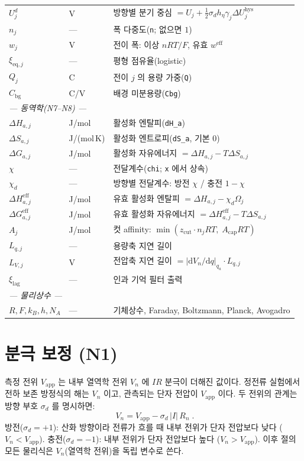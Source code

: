 \documentclass[11pt,a4paper]{article}
\newcommand{\dd}{\mathrm{d}}
\newcommand{\app}{\mathrm{app}}
\newcommand{\eq}{\mathrm{eq}}
\newcommand{\eff}{\mathrm{eff}}
\newcommand{\bg}{\mathrm{bg}}
\newcommand{\hys}{\mathrm{hys}}
\begin{document}
\begin{longtable}{p{} p{} p{}}
$U_j^d$ & V & 방향별 분기 중심 $=U_j+\tfrac12\sigma_d h_\eta\gamma_j\Delta U_j^\hys$\\
$n_j$ & --- & 폭 다중도(\texttt{n}; 없으면 $1$)\\
$w_j$ & V & 전이 폭: 이상 $nRT/F$, 유효 $w^\eff$\\
$\xi_{\eq,j}$ & --- & 평형 점유율(logistic)\\
$Q_j$ & C & 전이 $j$ 의 용량 가중(\texttt{Q})\\
$C_\bg$ & C/V & 배경 미분용량(\texttt{Cbg})\\
\multicolumn{3}{l}{\emph{--- 동역학(N7--N8) ---}}\\
$\Delta H_{a,j}$ & J/mol & 활성화 엔탈피(\texttt{dH\_a})\\
$\Delta S_{a,j}$ & J/(mol\,K) & 활성화 엔트로피(\texttt{dS\_a}, 기본 0)\\
$\Delta G_{a,j}$ & J/mol & 활성화 자유에너지 $=\Delta H_{a,j}-T\Delta S_{a,j}$\\
$\chi$ & --- & 전달계수(\texttt{chi}; \texttt{x} 에서 상속)\\
$\chi_d$ & --- & 방향별 전달계수: 방전 $\chi$ / 충전 $1-\chi$\\
$\Delta H_{a,j}^\eff$ & J/mol & 유효 활성화 엔탈피 $=\Delta H_{a,j}-\chi_d\Omega_j$\\
$\Delta G_{a,j}^\eff$ & J/mol & 유효 활성화 자유에너지 $=\Delta H_{a,j}^\eff-T\Delta S_{a,j}$\\
$A_j$ & J/mol & 컷 affinity: $\min(z_\mathrm{cut}\cdot n_jRT,\;A_\mathrm{cap}RT)$\\
$L_{q,j}$ & --- & 용량축 지연 길이\\
$L_{V,j}$ & V & 전압축 지연 길이 $=|\dd V_n/\dd q|_{q_a}\cdot L_{q,j}$\\
$\xi_\mathrm{lag}$ & --- & 인과 기억 필터 출력\\
\multicolumn{3}{l}{\emph{--- 물리상수 ---}}\\
$R,F,k_B,h,N_A$ & --- & 기체상수, Faraday, Boltzmann, Planck, Avogadro\\
\bottomrule
\end{longtable}

\section{분극 보정 (N1)}\label{sec:polcorr}

측정 전위 $V_\app$ 는 내부 열역학 전위 $V_n$ 에 $IR$ 분극이 더해진 값이다.
정전류 실험에서 전하 보존 방정식의 해는 $V_n$ 이고, 관측되는 단자 전압이
$V_\app$ 이다. 두 전위의 관계는 방향 부호 $\sigma_d$ 를 명시하면:
\begin{equation}
\boxed{\;V_n = V_\app - \sigma_d\,|I|\,R_n\;.}
\label{eq:vn}
\end{equation}
방전($\sigma_d=+1$): 산화 방향이라 전류가 흐를 때 내부 전위가 단자 전압보다 낮다
($V_n < V_\app$). 충전($\sigma_d=-1$): 내부 전위가 단자 전압보다 높다
($V_n > V_\app$). 이후 절의 모든 물리식은 $V_n$(열역학 전위)을 독립 변수로 쓴다.
\end{document}
